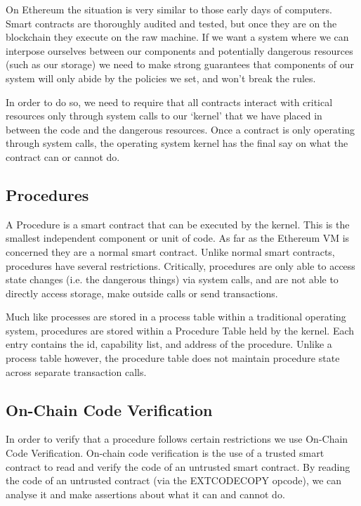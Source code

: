 \documentclass[english,a4paper]{article}
\begin{document}
On Ethereum the situation is very similar to those early days of
computers. Smart contracts are thoroughly audited and tested, but once
they are on the blockchain they execute on the raw machine. If we want a
system where we can interpose ourselves between our components and
potentially dangerous resources (such as our storage) we need to make
strong guarantees that components of our system will only abide by the policies
we set, and won't break the rules.

In order to do so, we need to require that all contracts interact with critical
resources only through system calls to our `kernel' that we have placed in
between the code and the dangerous resources. Once a contract is only operating
through system calls, the operating system kernel has the final say on what the
contract can or cannot do.

\subsection{Procedures}\label{procedures}
A Procedure is a smart contract that can be executed by the kernel. This is the
smallest independent component or unit of code. As far as the Ethereum VM is
concerned they are a normal smart contract.
Unlike normal smart contracts, procedures have several restrictions.
Critically, procedures are only able to access state changes (i.e. the dangerous
things) via system
calls, and are not able to directly access storage, make outside calls
or send transactions.

Much like processes are stored in a process table within a traditional
operating system, procedures are stored within a Procedure Table held by the
kernel. Each
entry contains the id, capability list, and address of the procedure.
Unlike a process table however, the procedure table does not maintain
procedure state across separate transaction calls.

\subsection{On-Chain Code
Verification}\label{on-chain-code-verification}
In order to verify that a procedure follows certain restrictions we use
On-Chain Code Verification. On-chain code verification is the use of a
trusted smart contract to read and verify the code of an untrusted smart
contract. By reading the code of an untrusted contract (via the EXTCODECOPY
opcode), we can analyse it and make assertions about what it can and cannot do.
\end{document}

